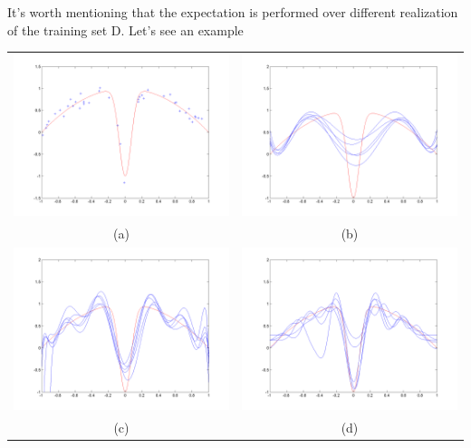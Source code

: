 \documentclass[main.tex]{subfiles}
\begin{document}
It's worth mentioning that the expectation is performed over different realization of the training set D.
Let's see an example
\begin{center}
    \begin{tabular}{cc}
        \includegraphics[width=70mm]{img/Test_function_and_noisy_data.png}        & \includegraphics[width=70mm]{img/Radial_basis_function_fit,_spread=5.png}   \\
        (a)                                                                       & (b)                                                                         \\[6pt]
        \includegraphics[width=70mm]{img/Radial_basis_function_fit,_spread=1.png} & \includegraphics[width=70mm]{img/Radial_basis_function_fit,_spread=0.1.png} \\
        (c)                                                                       & (d)                                                                         \\[6pt]
    \end{tabular}
\end{center}
\end{document}
